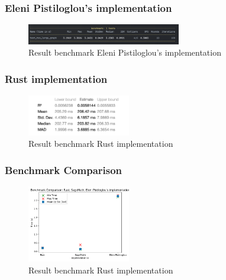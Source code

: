 \subsubsection*{Eleni Pistiloglou's implementation}
\begin{figure}[!h]
    \centering
    \includegraphics[width=0.60\textwidth]{images/benchmark/too_large_graph/benchmark_too_large_graph_python}
    \caption{Result benchmark Eleni Pistiloglou's implementation}
    \label{fig:benchmark-graph-500-24876-python}
\end{figure}

\subsubsection*{Rust implementation}
\begin{figure}[!h]
    \centering
    \includegraphics[width=0.40\textwidth]{images/benchmark/too_large_graph/benchmark_graph_500_24876_rust}
    \caption{Result benchmark Rust implementation}
    \label{fig:benchmark-graph-500-24876-rust}
\end{figure}

\subsubsection*{Benchmark Comparison}
\begin{figure}[!h]
    \centering
    \includegraphics[width=0.40\textwidth]{images/benchmark/too_large_graph/benchmark_comparison_graph_500_24876}
    \caption{Result benchmark Rust implementation}
    \label{fig:benchmark-comparison-graph-500-24876}
\end{figure}


